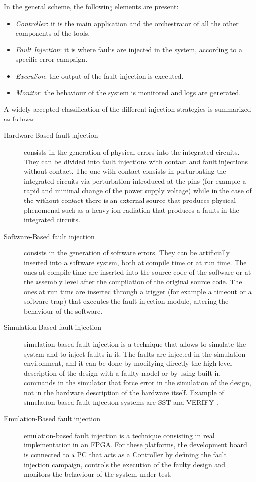 In the general scheme, the following elements are present:

\begin{itemize}
    \item \textit{Controller}: it is the main application and the orchestrator of all the other components of the tools.
    \item \textit{Fault Injection}: it is where faults are injected in the system, according to a specific error campaign.
    \item \textit{Execution}: the output of the fault injection is executed.
    \item \textit{Monitor}: the behaviour of the system is monitored and logs are generated.
\end{itemize}

A widely accepted classification of the different injection strategies is summarized as follows:

\begin{description}
    \item[Hardware-Based fault injection] consists in the generation of physical errors into the integrated circuits. They can be divided into fault injections with contact and fault injections without contact. The one with contact consists in perturbating the integrated circuits via perturbation introduced at the pins (for example a rapid and minimal change of the power supply voltage) while in the case of the without contact there is an external source that produces physical phenomenal such as a heavy ion radiation that produces a faults in the integrated circuits.
    \item[Software-Based fault injection] consists in the generation of software errors. They can be artificially inserted into a software system, both at compile time or at run time. The ones at compile time \cite{fithesisdrizz} are inserted into the source code of the software or at the assembly level after the compilation of the original source code. The ones at run time are inserted through a trigger (for example a timeout or a software trap) that executes the fault injection module, altering the behaviour of the software.
    \item[Simulation-Based fault injection] simulation-based fault injection is a technique that allows to simulate the system and to inject faults in it. The faults are injected in the simulation environment, and it can be done by modifying directly the high-level description of the design with a faulty model or by using built-in commands in the simulator that force error in the simulation of the design, not in the hardware description of the hardware itself. Example of simulation-based fault injection systems are SST \cite{4375147} and VERIFY \cite{614074}.
    \item[Emulation-Based fault injection] emulation-based fault injection is a technique consisting in real implementation in an FPGA. For these platforms, the development board is connected to a PC that acts as a Controller by defining the fault injection campaign, controls the execution of the faulty design and monitors the behaviour of the system under test.
\end{description}

